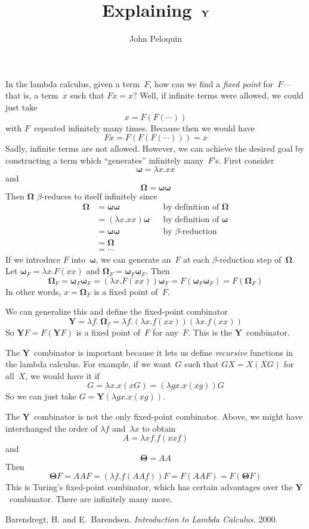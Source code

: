 \documentclass[letterpaper,12pt]{article}
\title{Explaining~\(\Y\)}
\author{John Peloquin}
\date{}
\newcommand{\Y}{\mathbf{Y}}
\newcommand{\om}{\mathbf{\omega}}
\newcommand{\Om}{\mathbf{\Omega}}
\newcommand{\Th}{\mathbf{\Theta}}
\begin{document}
\maketitle

\noindent In the lambda calculus, given a term~\(F\), how can we find a \emph{fixed point} for~\(F\)---that is, a term~\(x\) such that \(Fx=x\)? Well, if infinite terms were allowed, we could just take
\[x=F(F(\cdots))\]
with \(F\)~repeated infinitely many times. Because then we would have
\[Fx=F(F(F(\cdots)))=x\]
Sadly, infinite terms are not allowed. However, we can achieve the desired goal by constructing a term which ``generates'' infinitely many~\(F\)'s. First consider
\[\om=\lambda x.xx\]
and
\[\Om=\om\om\]
Then \(\Om\) \(\beta\)-reduces to itself infinitely since
\begin{align*}
\Om&=\om\om&&\text{by definition of }\Om\\
	&=(\lambda x.xx)\om&&\text{by definition of }\om\\
	&=\om\om&&\text{by }\beta\text{-reduction}\\
	&=\Om&&\\
	&=\cdots&&
\end{align*}
If we introduce \(F\) into~\(\om\), we can generate an~\(F\) at each \(\beta\)-reduction step of~\(\Om\). Let \(\om_F=\lambda x.F(xx)\) and \(\Om_F=\om_F\om_F\). Then
\[\Om_F=\om_F\om_F=(\lambda x.F(xx))\om_F=F(\om_F\om_F)=F(\Om_F)\]
In other words, \(x=\Om_F\) is a fixed point of~\(F\).

We can generalize this and define the fixed-point combinator
\[\Y=\lambda f.\ \Om_f=\lambda f.(\lambda x.f(xx))(\lambda x.f(xx))\]
So \(\Y F=F(\Y F)\) is a fixed point of~\(F\) for any~\(F\). This is the \(\Y\)~combinator.

The \(\Y\)~combinator is important because it lets us define \emph{recursive} functions in the lambda calculus. For example, if we want~\(G\) such that \(GX=X(XG)\) for all~\(X\), we would have it if
\[G=\lambda x.x(xG)=(\lambda gx.x(xg))G\]
So we can just take \(G=\Y(\lambda gx.x(xg))\).

The \(\Y\)~combinator is not the only fixed-point combinator. Above, we might have interchanged the order of \(\lambda f\) and~\(\lambda x\) to obtain
\[A=\lambda xf.f(xxf)\]
and
\[\Th=AA\]
Then
\[\Th F=AAF=(\lambda f.f(AAf))F=F(AAF)=F(\Th F)\]
This is Turing's fixed-point combinator, which has certain advantages over the \(\Y\)~combinator. There are infinitely many more.
\begin{thebibliography}{0}
 Barendregt, H. and E.~Barendsen. \textit{Introduction to Lambda Calculus.} 2000.
\end{thebibliography}
\end{document}
